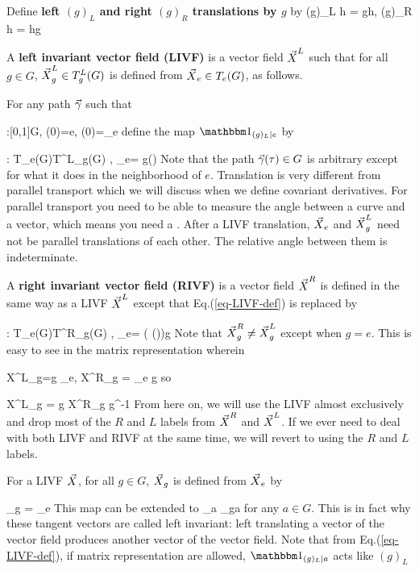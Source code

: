 Define {\bf left $(g)_L$ and right $(g)_R$
 translations by $g$} by
\beq
(g)_L h = gh, \quad (g)_R h = hg
\eeq

A {\bf left invariant vector field (LIVF)} is
a vector field ${\vec{X}}^L$ such that for all $g\in G$, ${\vec{X}}_{g}^L\in T^L_g (G)$
 is defined  from ${\vec{X}}_{e}\in  T_e(G)$, as follows.

For any path ${\vec{\gamma}}$ such that

\beq
\vgamma:[0,1]\rarrow G, \quad
\vgamma(0)=e, \quad
\dot{\vgamma}(0)=\vecX_{e}
\eeq
define the map $\dL{g}{e}$ by

\beq
{}: T_e(G)\rarrow T^L_g(G)
,\quad
{}\vecX_{e}=  g\vgamma(\tau)
\label{eq-LIVF-def}
\eeq
Note that the path ${\vec{\gamma}}(\tau)\in G$ is
arbitrary except for what it does in the
neighborhood of $e$.
Translation is
very different from parallel
transport which we will
discuss when we define
covariant derivatives.
For parallel transport 
you need to be able to
measure the angle
between a curve and a vector, 
which means you need a .
After a LIVF translation,
${\vec{X}}_e$ and ${\vec{X}}_g^L$ need not
be parallel translations of each other.
The relative angle between them is indeterminate.

A {\bf right invariant vector field (RIVF)} is
a vector field ${\vec{X}}^R$
is defined in the same way as a
LIVF ${\vec{X}}^L$ except that
Eq.(\ref{eq-LIVF-def}) is replaced by

\beq
{}: T_e(G)\rarrow T^R_g(G)
,\quad
{}\vecX_{e}= \left( \vgamma(\tau)\right)g
\label{eq-RIVF-def}
\eeq
Note that ${\vec{X}}^R_g\neq {\vec{X}}^L_g$
except when $g=e$.
This is easy to see in
the matrix representation wherein

\beq
X^L_g=g \vecX_e, 
\quad X^R_g = \vecX_e g
\eeq
so 

\beq
X^L_g = g X^R_g  g^{-1}
\eeq
From here on, we 
will use the LIVF almost
exclusively and drop
most of the $R$ and $L$ labels
from ${\vec{X}}^R$
and ${\vec{X}}^L$. If 
we ever need to deal with
both LIVF and RIVF at
the same time, 
we will revert 
to using the $R$ and $L$
labels.

For a LIVF ${\vec{X}}$, 
for all $g\in G$,
${\vec{X}}_g$ is defined from ${\vec{X}}_e$ by

\beq
\vecX_g = \vecX_e
\label{eq-dl-def}
\eeq
This map can be
extended to
\beq
{}
\vecX_{a} \eqdef
\vecX_{ga}
\eeq
for any $a\in G$.
This is in fact why these
tangent vectors are called
left invariant: left translating
a vector of the vector field
produces another vector of the
vector field. Note that from Eq.(\ref{eq-LIVF-def}),
if matrix representation are allowed,
$\dL{g}{a}$ acts like  $(g)_L$

